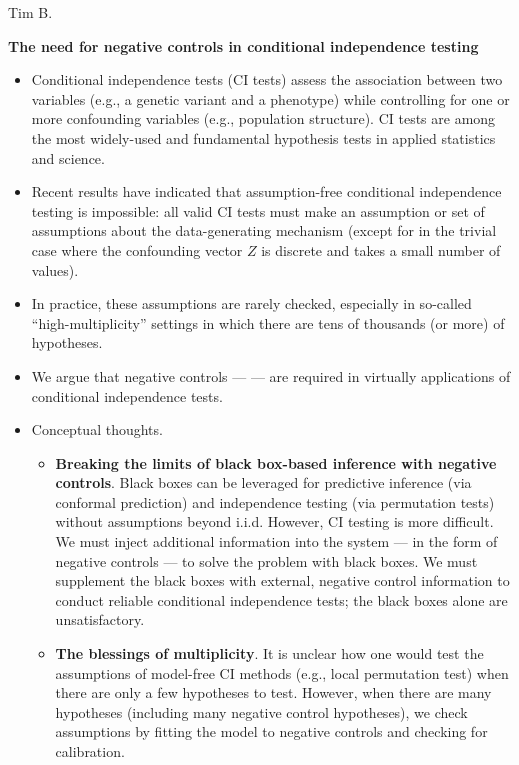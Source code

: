 \documentclass[12pt]{article}
\begin{document}
\noindent
Tim B.
\begin{center}
\textbf{The need for negative controls in conditional independence testing}
\end{center}

\begin{itemize}
\item Conditional independence tests (CI tests) assess the association between two variables (e.g., a genetic variant and a phenotype) while controlling for one or more confounding variables (e.g., population structure). CI tests are among the most widely-used and fundamental hypothesis tests in applied statistics and science.
\item Recent results have indicated that assumption-free conditional independence testing is impossible: all valid CI tests must make an assumption or set of assumptions about the data-generating mechanism (except for in the trivial case where the confounding vector $Z$ is discrete and takes a small number of values).
\item In practice, these assumptions are rarely checked, especially in so-called ``high-multiplicity'' settings in which there are tens of thousands (or more) of hypotheses.

\item We argue that negative controls ---   --- are required in virtually applications of conditional independence tests.

\item Conceptual thoughts.
\begin{itemize}
\item \textbf{Breaking the limits of black box-based inference with negative controls}. Black boxes can be leveraged for predictive inference (via conformal prediction) and independence testing (via permutation tests) without assumptions beyond i.i.d. However, CI testing is more difficult. We must inject additional information into the system --- in the form of negative controls --- to solve the problem with black boxes. We must supplement the black boxes with external, negative control information to conduct reliable conditional independence tests; the black boxes alone are unsatisfactory.

\item \textbf{The blessings of multiplicity}. It is unclear how one would test the assumptions of model-free CI methods (e.g., local permutation test) when there are only a few hypotheses to test. However, when there are many hypotheses (including many negative control hypotheses), we check assumptions by fitting the model to negative controls and checking for calibration.
\end{itemize}


\end{itemize}
\end{document}
